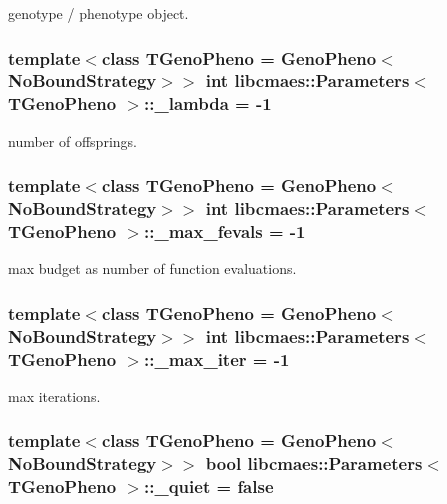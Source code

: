 genotype / phenotype object. \hypertarget{classlibcmaes_1_1Parameters_af732f7206f23cbd6ec2bbd4e217a9a2b}{
\subsubsection[{\-\_\-lambda}]{\setlength{\rightskip}{0pt plus 5cm}template$<$class T\-Geno\-Pheno = Geno\-Pheno$<$\-No\-Bound\-Strategy$>$$>$ int {\bf libcmaes\-::\-Parameters}$<$ T\-Geno\-Pheno $>$\-::\-\_\-lambda = -\/1}}\label{classlibcmaes_1_1Parameters_af732f7206f23cbd6ec2bbd4e217a9a2b}
number of offsprings. \hypertarget{classlibcmaes_1_1Parameters_ad316488121bd51f62b28e8183d591c9e}{
\subsubsection[{\-\_\-max\-\_\-fevals}]{\setlength{\rightskip}{0pt plus 5cm}template$<$class T\-Geno\-Pheno = Geno\-Pheno$<$\-No\-Bound\-Strategy$>$$>$ int {\bf libcmaes\-::\-Parameters}$<$ T\-Geno\-Pheno $>$\-::\-\_\-max\-\_\-fevals = -\/1}}\label{classlibcmaes_1_1Parameters_ad316488121bd51f62b28e8183d591c9e}
max budget as number of function evaluations. \hypertarget{classlibcmaes_1_1Parameters_a60abfc730c5aa46e42ebd1598b59caa6}{
\subsubsection[{\-\_\-max\-\_\-iter}]{\setlength{\rightskip}{0pt plus 5cm}template$<$class T\-Geno\-Pheno = Geno\-Pheno$<$\-No\-Bound\-Strategy$>$$>$ int {\bf libcmaes\-::\-Parameters}$<$ T\-Geno\-Pheno $>$\-::\-\_\-max\-\_\-iter = -\/1}}\label{classlibcmaes_1_1Parameters_a60abfc730c5aa46e42ebd1598b59caa6}
max iterations. \hypertarget{classlibcmaes_1_1Parameters_a6f6dad55c02a23891e3280cad288295a}{
\subsubsection[{\-\_\-quiet}]{\setlength{\rightskip}{0pt plus 5cm}template$<$class T\-Geno\-Pheno = Geno\-Pheno$<$\-No\-Bound\-Strategy$>$$>$ bool {\bf libcmaes\-::\-Parameters}$<$ T\-Geno\-Pheno $>$\-::\-\_\-quiet = false}}\label{classlibcmaes_1_1Parameters_a6f6dad55c02a23891e3280cad288295a}
